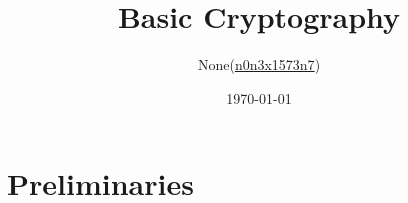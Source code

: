 \documentclass{article}
\title{Basic Cryptography}
\author{None(\href{https://www.twitter.com/n0n3x1573n7}{n0n3x1573n7})}
\date{\today}
\theoremstyle{definition}
\begin{document}
	\maketitle
	
	\section{Preliminaries}
	
\end{document}
